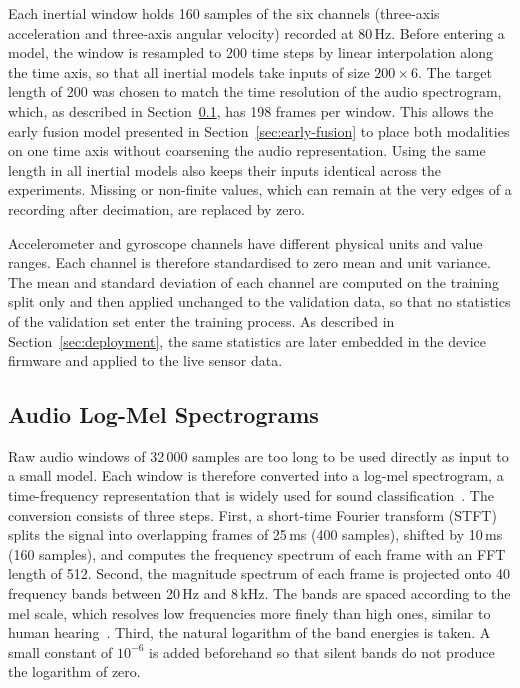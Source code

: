 Each inertial window holds 160 samples of the six channels (three-axis
acceleration and three-axis angular velocity) recorded at 80\,Hz. Before entering
a model, the window is resampled to 200 time steps by linear interpolation along
the time axis, so that all inertial models take inputs of size $200 \times 6$.
The target length of 200 was chosen to match the time resolution of the audio
spectrogram, which, as described in Section~\ref{sec:logmel}, has 198 frames per
window. This allows the early fusion model presented in
Section~\ref{sec:early-fusion} to place both modalities on one time axis without
coarsening the audio representation. Using the same length in all inertial models
also keeps their inputs identical across the experiments. Missing or non-finite
values, which can remain at the very edges of a recording after decimation, are
replaced by zero.

Accelerometer and gyroscope channels have different physical units and value
ranges. Each channel is therefore standardised to zero mean and unit variance.
The mean and standard deviation of each channel are computed on the training
split only and then applied unchanged to the validation data, so that no
statistics of the validation set enter the training process. As described in
Section~\ref{sec:deployment}, the same statistics are later embedded in the
device firmware and applied to the live sensor data.

\subsection{Audio Log-Mel Spectrograms}
\label{sec:logmel}

Raw audio windows of 32\,000 samples are too long to be used directly as input
to a small model. Each window is therefore converted into a log-mel spectrogram,
a time-frequency representation that is widely used for sound classification~\cite{piczak2015environmental, koch2024recognition}. The conversion consists of three steps. First, a short-time
Fourier transform (STFT) splits the signal into overlapping frames of 25\,ms (400
samples), shifted by 10\,ms (160 samples), and computes the frequency spectrum of
each frame with an FFT length of 512. Second, the magnitude spectrum of each frame
is projected onto 40 frequency bands between 20\,Hz and 8\,kHz. The bands are
spaced according to the mel scale, which resolves low frequencies more finely than
high ones, similar to human hearing~\cite{stevens1937scale}. Third, the natural logarithm of
the band energies is taken. A small constant of $10^{-6}$ is added beforehand so
that silent bands do not produce the logarithm of zero.

